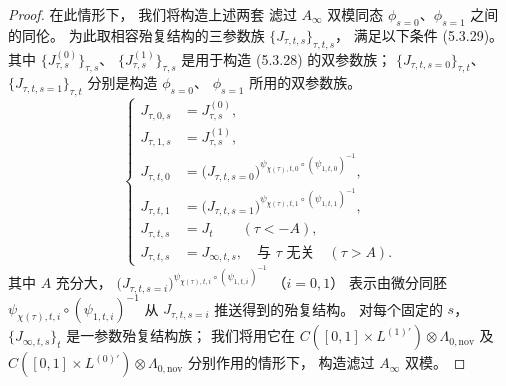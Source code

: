 \begin{proof}
在此情形下，
我们将构造上述两套
滤过 $A_\infty$ 双模同态
$\phi_{s=0}$、$\phi_{s=1}$
之间的同伦。
为此取相容殆复结构的三参数族
$\{J_{\tau,t,s}\}_{\tau,t,s}$，
满足以下条件 (5.3.29)。
其中
$\{J^{(0)}_{\tau,s}\}_{\tau,s}$、
$\{J^{(1)}_{\tau,s}\}_{\tau,s}$
是用于构造 (5.3.28) 的双参数族；
$\{J_{\tau,t,s=0}\}_{\tau,t}$、
$\{J_{\tau,t,s=1}\}_{\tau,t}$
分别是构造 $\phi_{s=0}$、
$\phi_{s=1}$ 所用的双参数族。
\begin{equation}
\left\{
\begin{aligned}
J_{\tau,0,s}&=J^{(0)}_{\tau,s},\\
J_{\tau,1,s}&=J^{(1)}_{\tau,s},\\
J_{\tau,t,0}
&=\bigl(J_{\tau,t,s=0}\bigr)^{
\psi_{\chi(\tau),t,0}\circ
(\psi_{1,t,0})^{-1}},\\
J_{\tau,t,1}
&=\bigl(J_{\tau,t,s=1}\bigr)^{
\psi_{\chi(\tau),t,1}\circ
(\psi_{1,t,1})^{-1}},\\
J_{\tau,t,s}&=J_t
\qquad(\tau<-A),\\
J_{\tau,t,s}&=J_{\infty,t,s},
\quad\text{与 }\tau\text{ 无关}\quad(\tau>A).
\end{aligned}
\right.
\tag{5.3.29}\label{eq:5-3-29}
\end{equation}
其中 $A$ 充分大，
$\bigl(J_{\tau,t,s=i}\bigr)^{
\psi_{\chi(\tau),t,i}\circ
(\psi_{1,t,i})^{-1}}$
（$i=0,1$）
表示由微分同胚
$\psi_{\chi(\tau),t,i}
\circ(\psi_{1,t,i})^{-1}$
从 $J_{\tau,t,s=i}$
推送得到的殆复结构。
对每个固定的 $s$，
$\{J_{\infty,t,s}\}_t$
是一参数殆复结构族；
我们将用它在
$C([0,1]\times L^{(1)\prime})
\otimes\Lambda_{0,\mathrm{nov}}$
及
$C([0,1]\times L^{(0)\prime})
\otimes\Lambda_{0,\mathrm{nov}}$
分别作用的情形下，
构造滤过 $A_\infty$ 双模。


\end{proof}
